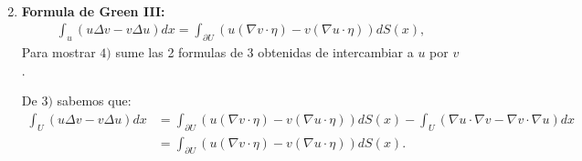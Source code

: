 \begin{homeworkProblem}
\begin{enumerate}
\begin{solucion}
\begin{align*}
        \end{align*}
      \end{solucion}
    \newpage
    \item \textbf{Formula de Green III:}
      \begin{align*}
        \int_{u}(u\Delta v - v\Delta u)dx=\int_{\partial U}(u(\nabla v \cdot \eta)-v(\nabla u\cdot \eta))dS(x),
      \end{align*}
      Para mostrar $4)$ sume las 2 formulas de $3$ obtenidas de intercambiar a $u$ por $v$. 
      \begin{solucion}
        De $3)$ sabemos que:
        \begin{align*}
          \int_{U}(u\Delta v-v\Delta u)dx&=\int_{\partial U}(u(\nabla v\cdot \eta)-v(\nabla u\cdot \eta))dS(x)-\int_{U}(\nabla u\cdot \nabla v - \nabla v \cdot \nabla u)dx\\
          &=\int_{\partial U}(u(\nabla v\cdot \eta)-v(\nabla u\cdot \eta))dS(x).
        \end{align*}
      \end{solucion}
  \end{enumerate}
\end{homeworkProblem}
